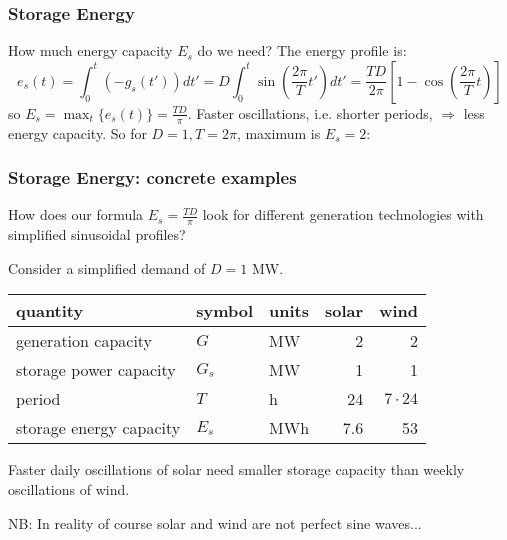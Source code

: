 \documentclass[10pt,aspectratio=169,dvipsnames]{beamer}
\newcommand{\ra}[1]{\renewcommand{\arraystretch}{#1}}
\begin{document}
\begin{frame}
  \frametitle{Storage Energy}

  How much energy capacity $E_{s}$ do we need? The energy profile is:
  \begin{equation*}
    e_s(t) = \int_{0}^{t} (-g_s(t')) dt' = D \int_0^t \sin\left(\frac{2\pi}{T} t'\right) dt' =  \frac{TD}{2\pi}\left[ 1 - \cos\left(\frac{2\pi}{T} t\right)\right]
  \end{equation*}
  so $E_s = \max_t\{e_s(t)\} = \frac{TD}{\pi}$. Faster oscillations, i.e. shorter periods, $\Rightarrow$ less energy capacity. So for $D =1, T = 2\pi$, maximum is $E_s = 2$:


\end{frame}

\begin{frame}
  \frametitle{Storage Energy: concrete examples}

  How does our formula $E_s = \frac{TD}{\pi}$ look for different
  generation technologies with simplified sinusoidal profiles?

  Consider a simplified demand of $D = 1$ MW.
  \ra{1.05}
  \begin{table}[!t]
    \begin{tabular}{lllrr}
      \toprule
      quantity & symbol & units & solar & wind\\
      \midrule
      generation capacity &$G$ & MW & 2 & 2 \\
      storage power capacity & $G_s$ & MW & 1 & 1 \\
      period & $T$ & h & 24 & $7 \cdot 24$\\
      storage energy capacity & $E_s$ & MWh & 7.6 &  53 \\
      \bottomrule
    \end{tabular}
  \end{table}
  Faster daily oscillations of solar need smaller storage capacity than weekly oscillations of wind.

  NB: In reality of course solar and wind are not perfect sine waves...
\end{frame}
\end{document}
